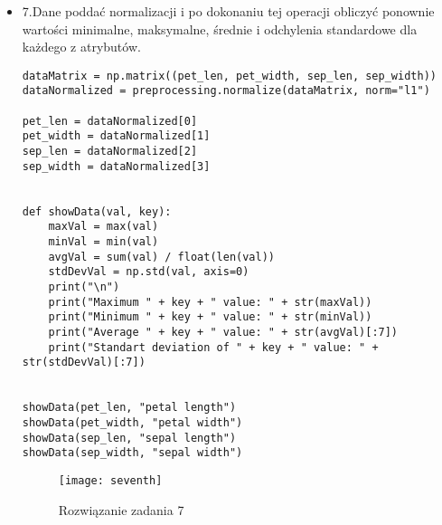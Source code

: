 \documentclass[12pt,a4paper]{article}
\begin{document}
\begin{itemize}
\begin{lstlisting}
    if key == "Iris-setosa":
        index = 0
    elif key == "Iris-versicolor":
        index = 1
    elif key == "Iris-virginica":
        index = 2
    print("\n" + key + " average attributes values:"
          + "\npetal length: " + str(avg_pet_len[index])[:5]
          + "\npetal width: " + str(avg_pet_width[index])[:5]
          + "\nsepal length: " + str(avg_sep_len[index])[:5]
          + "\nsepal width: " + str(avg_sep_width[index])[:5])


showData("Iris-setosa")
showData("Iris-versicolor")
showData("Iris-virginica")
	\end{lstlisting}
		\begin{figure}[h]
                        \texttt{[image: sixth]}
                        \centering
			\caption{Rozwiązanie zadania 6}
			\label{fig:fig6}
                \end{figure}
                \clearpage

                        \item 7.Dane poddać normalizacji i po dokonaniu tej operacji obliczyć ponownie wartości minimalne, maksymalne, średnie i odchylenia standardowe dla każdego z atrybutów.
	\begin{lstlisting}
dataMatrix = np.matrix((pet_len, pet_width, sep_len, sep_width))
dataNormalized = preprocessing.normalize(dataMatrix, norm="l1")

pet_len = dataNormalized[0]
pet_width = dataNormalized[1]
sep_len = dataNormalized[2]
sep_width = dataNormalized[3]


def showData(val, key):
    maxVal = max(val)
    minVal = min(val)
    avgVal = sum(val) / float(len(val))
    stdDevVal = np.std(val, axis=0)
    print("\n")
    print("Maximum " + key + " value: " + str(maxVal))
    print("Minimum " + key + " value: " + str(minVal))
    print("Average " + key + " value: " + str(avgVal)[:7])
    print("Standart deviation of " + key + " value: " + str(stdDevVal)[:7])


showData(pet_len, "petal length")
showData(pet_width, "petal width")
showData(sep_len, "sepal length")
showData(sep_width, "sepal width")
	\end{lstlisting}
		\begin{figure}[h]
                        \texttt{[image: seventh]}
                        \centering
			\caption{Rozwiązanie zadania 7}
			\label{fig:fig7}
                \end{figure}
                \clearpage


\end{itemize}
\end{document}
